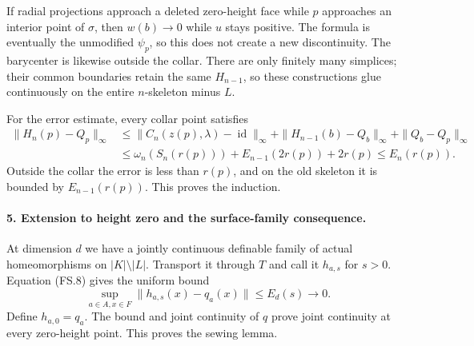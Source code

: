 If radial projections approach a deleted zero-height face while $p$
approaches an interior point of $\sigma$, then $w(b)\to0$ while $u$ stays
positive. The formula is eventually the unmodified $\psi_p$, so this does
not create a new discontinuity. The barycenter is likewise outside the
collar. There are only finitely many simplices; their common boundaries
retain the same $H_{n-1}$, so these constructions glue continuously on
the entire $n$-skeleton minus $L$.

For the error estimate, every collar point satisfies
\[
\begin{split}
 \|H_n(p)-Q_p\|_\infty
 &\le \|C_n(z(p),\lambda)-\operatorname{id}\|_\infty
       +\|H_{n-1}(b)-Q_b\|_\infty+\|Q_b-Q_p\|_\infty\\
 &\le\omega_n(S_n(r(p)))+E_{n-1}(2r(p))+2r(p)
 \le E_n(r(p)).
\end{split}
\]
Outside the collar the error is less than $r(p)$, and on the old skeleton
it is bounded by $E_{n-1}(r(p))$. This proves the induction.

\paragraph{5. Extension to height zero and the surface-family consequence.}
At dimension $d$ we have a jointly continuous definable family of actual
homeomorphisms on $|K|\setminus|L|$. Transport it through $T$ and call it
$h_{a,s}$ for $s>0$. Equation (FS.8) gives the uniform bound
\[
 \sup_{a\in A,x\in F}\|h_{a,s}(x)-q_a(x)\|\le E_d(s)\longrightarrow0.
\]
Define $h_{a,0}=q_a$. The bound and joint continuity of $q$ prove joint
continuity at every zero-height point. This proves the sewing lemma.

